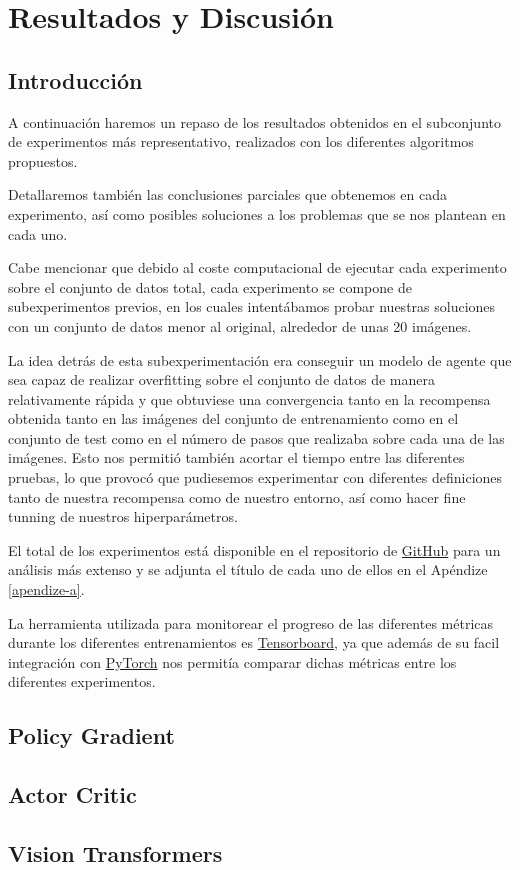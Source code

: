 
\cleardoublepage

\chapter{Resultados y Discusión}
\label{resultados-y-discusion}

\section{Introducción}
\label{resultados-introduccion}

A continuación haremos un repaso de los resultados obtenidos en el subconjunto de experimentos más representativo, realizados con los diferentes algoritmos propuestos.
\medskip

Detallaremos también las conclusiones parciales que obtenemos en cada experimento, así como posibles soluciones a los problemas que se nos plantean en cada uno.
\medskip

Cabe mencionar que debido al coste computacional de ejecutar cada experimento sobre el conjunto de datos total, cada experimento se compone de subexperimentos previos, en los cuales intentábamos probar nuestras soluciones con un conjunto de datos menor al original, alrededor de unas 20 imágenes. 
\medskip

La idea detrás de esta subexperimentación era conseguir un modelo de agente que sea capaz de realizar overfitting sobre el conjunto de datos de manera relativamente rápida y que obtuviese una convergencia tanto en la recompensa obtenida tanto en las imágenes del conjunto de entrenamiento como en el conjunto de test como en el número de pasos que realizaba sobre cada una de las imágenes. Esto nos permitió también acortar el tiempo entre las diferentes pruebas, lo que provocó que pudiesemos experimentar con diferentes definiciones tanto de nuestra recompensa como de nuestro entorno, así como hacer fine tunning de nuestros hiperparámetros.
\medskip

El total de los experimentos está disponible en el repositorio de \href{https://github.com/lucaswerner90/msc-degree-ai}{GitHub} para un análisis más extenso y se adjunta el título de cada uno de ellos en el Apéndize \ref{apendize-a}. 
\medskip

La herramienta utilizada para monitorear el progreso de las diferentes métricas durante los diferentes entrenamientos es \href{https://www.tensorflow.org/tensorboard?hl=es-419}{Tensorboard}, ya que además de su facil integración con \href{https://pytorch.org/}{PyTorch} nos permitía comparar dichas métricas entre los diferentes experimentos.


\section{Policy Gradient}
\label{resultados-policy-gradient}

\section{Actor Critic}
\label{resultados-actor-critic}

\section{Vision Transformers}
\label{resultados-vision-transformers}
